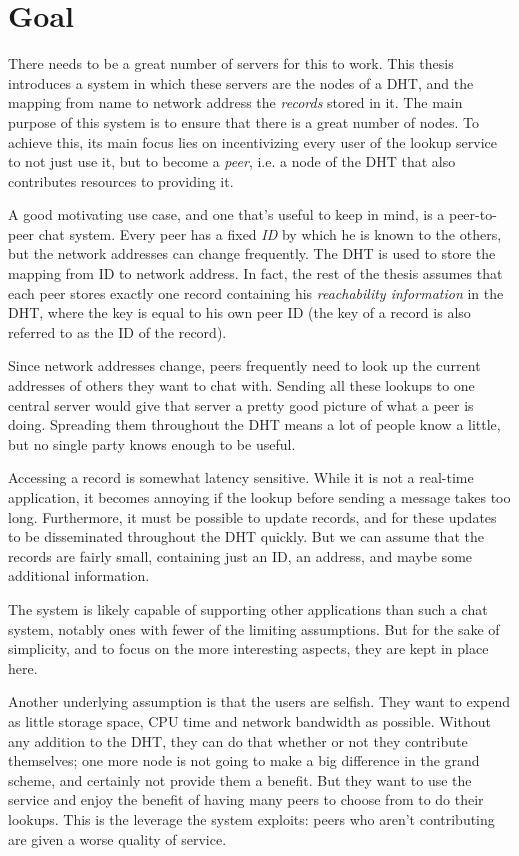 \section{Goal}
There needs to be a great number of servers for this to work. This thesis
introduces a system in which these servers are the nodes of a \ac{DHT}, and the
mapping from name to network address the \emph{records} stored in it. The main
purpose of this system is to ensure that there is a great number of nodes. To
achieve this, its main focus lies on incentivizing every user of the lookup
service to not just use it, but to become a \emph{peer}, i.e. a node of the
\ac{DHT} that also contributes resources to providing it.

A good motivating use case, and one that's useful to keep in mind, is a
peer-to-peer chat system. Every peer has a fixed \emph{ID} by which he is known
to the others, but the network addresses can change frequently. The \ac{DHT} is
used to store the mapping from ID to network address. In fact, the rest of the
thesis assumes that each peer stores exactly one record containing his
\emph{reachability information} in the \ac{DHT}, where the key is equal to his
own peer ID (the key of a record is also referred to as the ID of the record).

Since network addresses change, peers frequently need to look up the current
addresses of others they want to chat with. Sending all these lookups to one
central server would give that server a pretty good picture of what a peer is
doing. Spreading them throughout the \ac{DHT} means a lot of people know a
little, but no single party knows enough to be useful.

Accessing a record is somewhat latency sensitive. While it is not a real-time
application, it becomes annoying if the lookup before sending a message takes
too long. Furthermore, it must be possible to update records, and for these
updates to be disseminated throughout the \ac{DHT} quickly. But we can assume
that the records are fairly small, containing just an ID, an address, and maybe
some additional information.

The system is likely capable of supporting other applications than such a chat
system, notably ones with fewer of the limiting assumptions. But for the sake of
simplicity, and to focus on the more interesting aspects, they are kept in place
here.

Another underlying assumption is that the users are selfish. They want to expend
as little storage space, CPU time and network bandwidth as possible. Without any
addition to the \ac{DHT}, they can do that whether or not they contribute
themselves; one more node is not going to make a big difference in the grand
scheme, and certainly not provide them a benefit. But they want to use the
service and enjoy the benefit of having many peers to choose from to do their
lookups. This is the leverage the system exploits: peers who aren't contributing
are given a worse quality of service.

